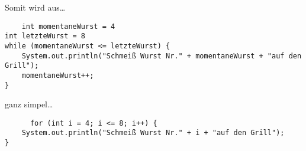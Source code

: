 \documentclass{../../presentation}
\begin{document}
\begin{frame}[fragile]
  Somit wird aus\dots
  
  \begin{verbatim}
    int momentaneWurst = 4
int letzteWurst = 8
while (momentaneWurst <= letzteWurst) {
	System.out.println("Schmeiß Wurst Nr." + momentaneWurst + "auf den Grill");
	momentaneWurst++;
}
  \end{verbatim}
  ganz simpel\dots
  \begin{verbatim}
      for (int i = 4; i <= 8; i++) {
	System.out.println("Schmeiß Wurst Nr." + i + "auf den Grill");
}
  \end{verbatim}

\end{frame}
\end{document}
